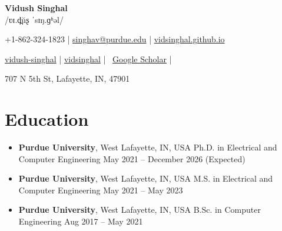 \documentclass[a4paper,11pt]{article}
\newcommand{\ipa}[1]{{\ipafont /#1/}}
\newcommand{\resumeSubHeadingListStart}{\begin{itemize}[leftmargin=*,labelsep=1mm]}
\newcommand{\resumeSubHeadingListEnd}{\end{itemize}\vspace{2mm}}
\newcommand{\socialicon}[1]{\raisebox{-0.05em}{\resizebox{!}{1em}{#1}}}
\newcommand{\ieeeicon}[1]{\raisebox{-0.3em}{\resizebox{!}{1.3em}{#1}}}
\newcommand{\headerfontiii}{\rmfamily}
\begin{document}
\headerfontiii

\begin{center}
    {\Huge\textbf{Vidush Singhal}}\\[-0.1mm]
    {\small \ipa{ʋɪ.d̪ŭʂ ˈsɪŋ.ɡʱəl}}
\end{center}
\vspace{-6mm}

\begin{center}
    \small{
    \socialicon{\faPhone} +1-862-324-1823 | \socialicon{\faEnvelope} \href{mailto:singhav@purdue.edu}{singhav@purdue.edu} | 
    \socialicon{\faHome} \href{https://vidsinghal.github.io}{vidsinghal.github.io}
    }
\end{center}
\vspace{-6mm}

\begin{center}
    \small{
    \socialicon{\faLinkedin} \href{https://www.linkedin.com/in/vidush-singhal/}{vidush-singhal} | 
    \socialicon{\faGithub} \href{https://github.com/vidsinghal}{vidsinghal} | 
    \faGraduationCap\ \href{https://scholar.google.com/citations?user=Rl-ErOsAAAAJ&hl=en}{Google Scholar} |
    }
\end{center}
\vspace{-6mm}
\begin{center}
    \small{707 N 5th St, Lafayette, IN, 47901}
\end{center}

\vspace{-4mm}

\section*{\textbf{Education}}
\resumeSubHeadingListStart
  \item \textbf{Purdue University}, West Lafayette, IN, USA  
	  \newline Ph.D. in Electrical and Computer Engineering \hfill May 2021 – December 2026 (Expected) 
  \item \textbf{Purdue University}, West Lafayette, IN, USA  
        \newline M.S. in Electrical and Computer Engineering \hfill May 2021 – May 2023
  \item \textbf{Purdue University}, West Lafayette, IN, USA  
        \newline B.Sc. in Computer Engineering \hfill Aug 2017 – May 2021
\resumeSubHeadingListEnd
\vspace{-6mm}
\end{document}
